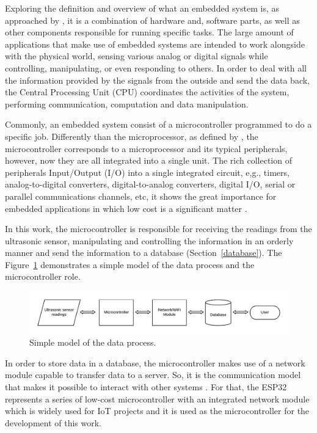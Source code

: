 Exploring the definition and overview of what an embedded system is, as approached by \cite{PECKOL:2008}, it is a combination of hardware and, software parts, as well as other components responsible for running specific tasks. The large amount of applications that make use of embedded systems are intended to work alongside with the physical world, sensing various analog or digital signals while controlling, manipulating, or even responding to others. In order to deal with all the information provided by the signals from the outside and send the data back, the Central Processing Unit (CPU) coordinates the activities of the system, performing communication, computation and data manipulation. 

Commonly, an embedded system consist of a microcontroller programmed to do a specific job. Differently than the microprocessor, as defined by \cite{NISOLOSI:2009}, the microcontroller corresponds to a microprocessor and its typical peripherals, however, now they are all integrated into a single unit. The rich collection of peripherals Input/Output (I/O) into a single integrated circuit, e,g., timers, analog-to-digital converters, digital-to-analog converters, digital I/O, serial or parallel communications channels, etc, it shows the great importance for embedded applications in which low cost is a significant matter \cite{PECKOL:2008}.

In this work, the microcontroller is responsible for receiving the readings from the ultrasonic sensor, manipulating and controlling the information in an orderly manner and send the information to a database (Section~\ref{database}). The Figure~\ref{fig:simpleModelOfTheDataProcess} demonstrates a simple model of the data process and the microcontroller role.

\begin{figure}[h!]
    \centering
    \includegraphics[width=.65\linewidth]{images/study_of_tools/embedded_system/simple_model.pdf}
    \caption{Simple model of the data process.}
    \label{fig:simpleModelOfTheDataProcess}
\end{figure}

In order to store data in a database, the microcontroller makes use of a network module capable to transfer data to a server. So, it is the communication model that makes it possible to interact with other systems \cite{KURNIAWAN:2019}. For that, the ESP32 represents a series of low-cost microcontroller with an integrated network module which is widely used for \gls{IoT} projects and it is used as the microcontroller for the development of this work.


